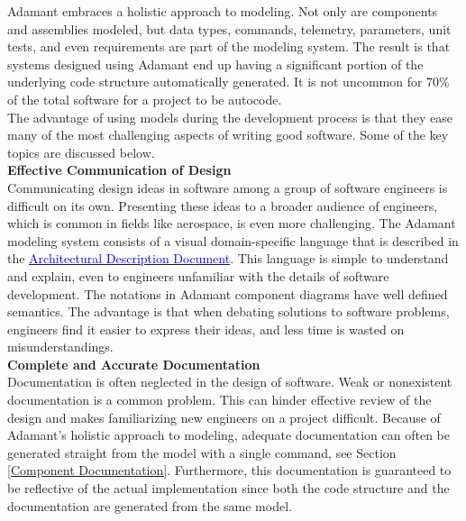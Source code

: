 Adamant embraces a holistic approach to modeling. Not only are components and assemblies modeled, but data types, commands, telemetry, parameters, unit tests, and even requirements are part of the modeling system. The result is that systems designed using Adamant end up having a significant portion of the underlying code structure automatically generated. It is not uncommon for 70\% of the total software for a project to be autocode. \\
 
The advantage of using models during the development process is that they ease many of the most challenging aspects of writing good software. Some of the key topics are discussed below. \\

\textbf{Effective Communication of Design} \\

Communicating design ideas in software among a group of software engineers is difficult on its own. Presenting these ideas to a broader audience of engineers, which is common in fields like aerospace, is even more challenging. The Adamant modeling system consists of a visual domain-specific language that is described in the \href{https://github.com/lasp/adamant/blob/main/doc/architecture_description_document/architecture_description_document.pdf}{\textcolor{blue}{Architectural Description Document}}. This language is simple to understand and explain, even to engineers unfamiliar with the details of software development. The notations in Adamant component diagrams have well defined semantics. The advantage is that when debating solutions to software problems, engineers find it easier to express their ideas, and less time is wasted on misunderstandings. \\

\textbf{Complete and Accurate Documentation} \\

Documentation is often neglected in the design of software. Weak or nonexistent documentation is a common problem. This can hinder effective review of the design and makes familiarizing new engineers on a project difficult. Because of Adamant's holistic approach to modeling, adequate documentation can often be generated straight from the model with a single command, see Section \ref{Component Documentation}. Furthermore, this documentation is guaranteed to be reflective of the actual implementation since both the code structure and the documentation are generated from the same model.  \\

